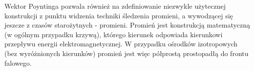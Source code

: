 Wektor Poyntinga pozwala również na zdefiniowanie niezwykle użytecznej konstrukcji z punktu widzenia techniki śledzenia promieni, a wywodzącej się jeszcze z czasów starożytnych - promieni. Promień jest konstrukcją matematyczną (w ogólnym przypadku krzywą), którego kierunek odpowiada kierunkowi przepływu energii elektromagnetycznej. W przypadku ośrodków izotropowych (bez wyróżnionych kierunków) promień jest więc półprostą prostopadłą do frontu falowego.

